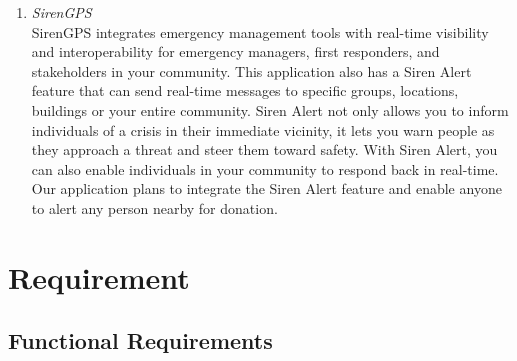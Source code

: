 \documentclass[conference]{IEEEtran}
\begin{document}
\begin{enumerate}
\item \textit{SirenGPS} \\
SirenGPS integrates emergency management tools with real-time visibility and interoperability for emergency managers, first responders, and stakeholders in your community. This application also has a Siren Alert feature that can send real-time messages to specific groups, locations, buildings or your entire community. Siren Alert not only allows you to inform individuals of a crisis in their immediate vicinity, it lets you warn people as they approach a threat and steer them toward safety. With Siren Alert, you can also enable individuals in your community to respond back in real-time. Our application plans to integrate the Siren Alert feature and enable anyone to alert any person nearby for donation. 
\end{enumerate}


\section{Requirement}

\subsection{Functional Requirements}
\end{document}
